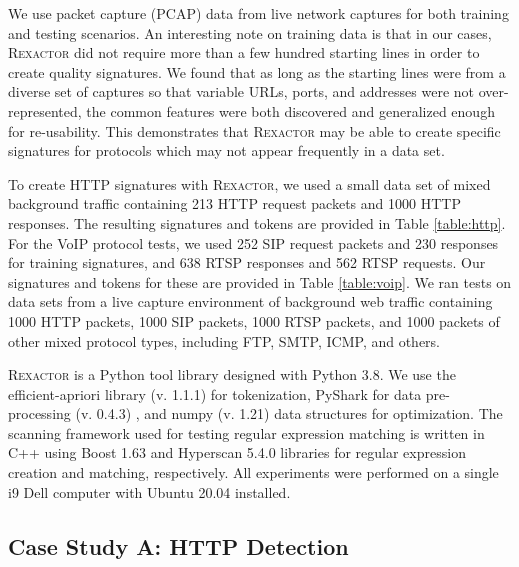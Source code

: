 We use packet capture (PCAP) data from live network captures for both training and testing scenarios. An interesting note on training data is that in our cases, \textsc{Rexactor} did not require more than a few hundred starting lines in order to create quality signatures. We found that as long as the starting lines were from a diverse set of captures so that variable URLs, ports, and addresses were not over-represented, the common features were both discovered and generalized enough for re-usability. This demonstrates that \textsc{Rexactor} may be able to create specific signatures for protocols which may not appear frequently in a data set.

To create HTTP signatures with \textsc{Rexactor}, we used a small data set of mixed background traffic containing 213 HTTP request packets and 1000 HTTP responses. The resulting signatures and tokens are provided in Table \ref{table:http}. For the VoIP protocol tests, we used 252 SIP request packets and 230 responses for training signatures, and 638 RTSP responses and 562 RTSP requests. Our signatures and tokens for these are provided in Table \ref{table:voip}. We ran tests on data sets from a live capture environment of background web traffic containing 1000 HTTP packets, 1000 SIP packets, 1000 RTSP packets, and 1000 packets of other mixed protocol types, including FTP, SMTP, ICMP, and others.

\textsc{Rexactor} is a Python tool library designed with Python 3.8. We use the efficient-apriori library (v. 1.1.1) \cite{efficient-apriori} for tokenization, PyShark for data pre-processing (v. 0.4.3) \cite{pyshark}, and numpy (v. 1.21) \cite{numpy} data structures for optimization.  The scanning framework used for testing regular expression matching is written in C++ using Boost 1.63 \cite{boost} and Hyperscan 5.4.0 \cite{hyperscan} libraries for regular expression creation and matching, respectively. All experiments were performed on a single i9 Dell computer with Ubuntu 20.04 installed.

\subsection{Case Study A: HTTP Detection}

